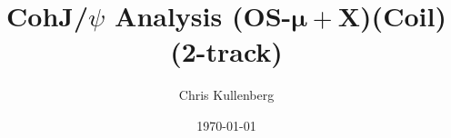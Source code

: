 \title{CohJ/$\psi$ Analysis (\textbf{OS}-$\boldsymbol{\mu+}$\textbf{X})(\textbf{Coil})(\textbf{2-track})}
\author{Chris Kullenberg}
\date{\today}

